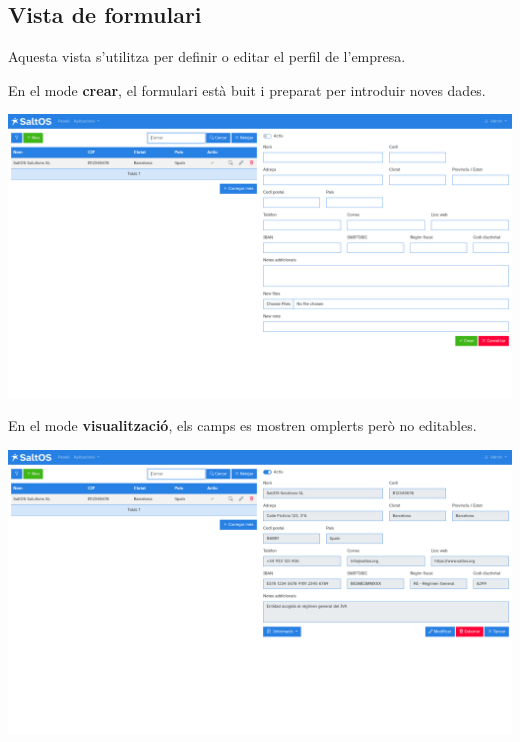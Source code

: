 \documentclass[a4paper]{article}
\begin{document}
\hypertarget{toc44}{}
\subsection{Vista de formulari}

Aquesta vista s'utilitza per definir o editar el perfil de l'empresa.

En el mode \textbf{crear}, el formulari està buit i preparat per introduir noves dades.

\begin{center}\includegraphics[width=1\textwidth]{../ujest/snaps/test-screenshots-js-screenshots-company-company-create-ca-es-1-snap.png}\end{center}

En el mode \textbf{visualització}, els camps es mostren omplerts però no editables.

\begin{center}\includegraphics[width=1\textwidth]{../ujest/snaps/test-screenshots-js-screenshots-company-company-view-1-ca-es-1-snap.png}\end{center}
\end{document}
